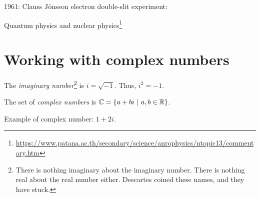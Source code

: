 






1961: Clauss J\"onsson electron double-slit experiment:


Quantum physics and nuclear physics\footnote{\url{https://www.patana.ac.th/secondary/science/anrophysics/ntopic13/commentary.htm}}

\section{Working with complex numbers}

The \emph{imaginary number}\footnote{There is nothing imaginary about the imaginary number.
There is nothing real about the real number either.
Descartes coined these names, and they have stuck.}
is \( i = \sqrt{-1} \).
Thus, \(i^2 = -1\).

The set of \emph{complex numbers} is \( \mathbb{C} = \{ a + bi ~|~ a, b \in \mathbb{R} \} \).

Example of complex number: \( 1 + 2i \).


